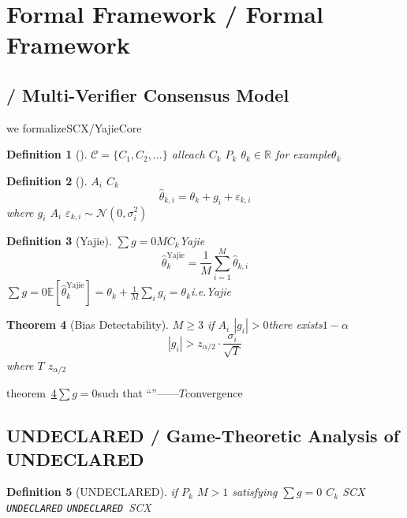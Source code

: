 \documentclass[12pt,a4paper]{article}
\newtheorem{theorem}{Theorem}[section]
\newtheorem{definition}[theorem]{Definition}
\theoremstyle{remark}
\newcommand{\R}{\mathbb{R}}
\newcommand{\E}{\mathbb{E}}
\newcommand{\C}{\mathcal{C}}
\newcommand{\yajie}{\text{Yajie}}
\newcommand{\sumgeq}{\sum g = 0}
\newcommand{\undeclared}{\texttt{UNDECLARED}}
\begin{document}
\section{Formal Framework / Formal Framework}

\subsection{ / Multi-Verifier Consensus Model}

we formalizeSCX/YajieCore

\begin{definition}[]
 $\C = \{C_1, C_2, \ldots\}$ alleach $C_k$  $P_k$  $\theta_k \in \R$
for example$\theta_k$ 
\end{definition}

\begin{definition}[]
 $A_i$  $C_k$ 
\begin{equation}
    \hat{\theta}_{k,i} = \theta_k + g_i + \varepsilon_{k,i}
\end{equation}
where $g_i$  $A_i$ $\varepsilon_{k,i} \sim \mathcal{N}(0, \sigma_i^2)$ 
\end{definition}

\begin{definition}[Yajie]
$\sumgeq$$M$$C_k$Yajie
\begin{equation}
    \hat{\theta}_k^{\yajie} = \frac{1}{M} \sum_{i=1}^{M} \hat{\theta}_{k,i}
\end{equation}
$\sumgeq$$\E[\hat{\theta}_k^{\yajie}] = \theta_k + \frac{1}{M}\sum_i g_i = \theta_k$i.e.Yajie
\end{definition}

\begin{theorem}[Bias Detectability]
\label{thm:bias_detectability}
 $M \geq 3$ if $A_i$  $|g_i| > 0$there exists$1 - \alpha$
\begin{equation}
    |g_i| > z_{\alpha/2} \cdot \frac{\sigma_i}{\sqrt{T}}
\end{equation}
where $T$ $z_{\alpha/2}$ 
\end{theorem}

theorem~\ref{thm:bias_detectability}$\sumgeq$such that
``''——$T$convergence

\subsection{UNDECLARED / Game-Theoretic Analysis of UNDECLARED}

\begin{definition}[UNDECLARED]
if $P_k$  $M>1$ satisfying $\sumgeq$  $C_k$ SCX \undeclared
\undeclared\ SCX
\end{definition}
\end{document}
